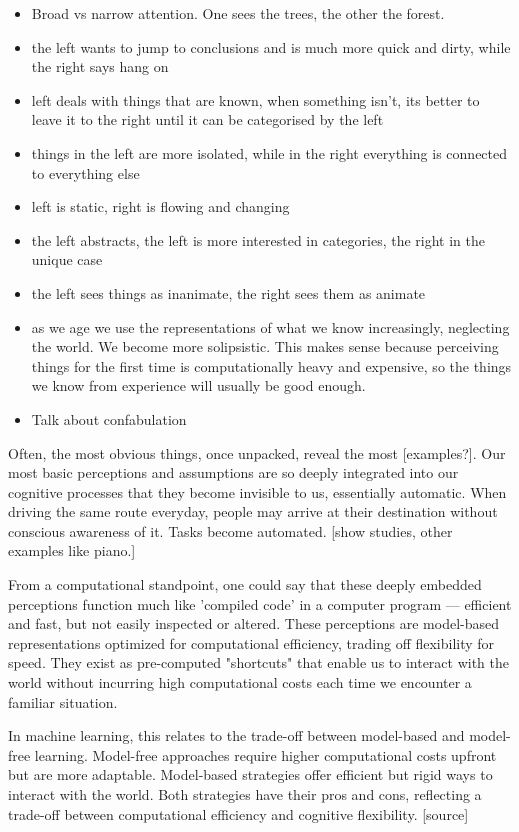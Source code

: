 \begin{itemize}
    \item Broad vs narrow attention. One sees the trees, the other the forest.
    \item the left wants to jump to conclusions and is much more quick and dirty, while the right says hang on
    \item left deals with things that are known, when something isn't, its better to leave it to the right until it can be categorised by the left
    \item things in the left are more isolated, while in the right everything is connected to everything else
    \item left is static, right is flowing and changing
    \item the left abstracts, the left is more interested in categories, the right in the unique case
    \item the left sees things as inanimate, the right sees them as animate
    \item as we age we use the representations of what we know increasingly, neglecting the world. We become more solipsistic. This makes sense because perceiving things for the first time is computationally heavy and expensive, so the things we know from experience will usually be good enough.
    \item Talk about confabulation
\end{itemize}

Often, the most obvious things, once unpacked, reveal the most [examples?]. Our most basic perceptions and assumptions are so deeply integrated into our cognitive processes that they become invisible to us, essentially automatic. When driving the same route everyday, people may arrive at their destination without conscious awareness of it. Tasks become automated. [show studies, other examples like piano.]

From a computational standpoint, one could say that these deeply embedded perceptions function much like 'compiled code' in a computer program — efficient and fast, but not easily inspected or altered. These perceptions are model-based representations optimized for computational efficiency, trading off flexibility for speed. They exist as pre-computed "shortcuts" that enable us to interact with the world without incurring high computational costs each time we encounter a familiar situation.

In machine learning, this relates to the trade-off between model-based and model-free learning. Model-free approaches require higher computational costs upfront but are more adaptable. Model-based strategies offer efficient but rigid ways to interact with the world. Both strategies have their pros and cons, reflecting a trade-off between computational efficiency and cognitive flexibility. [source]

